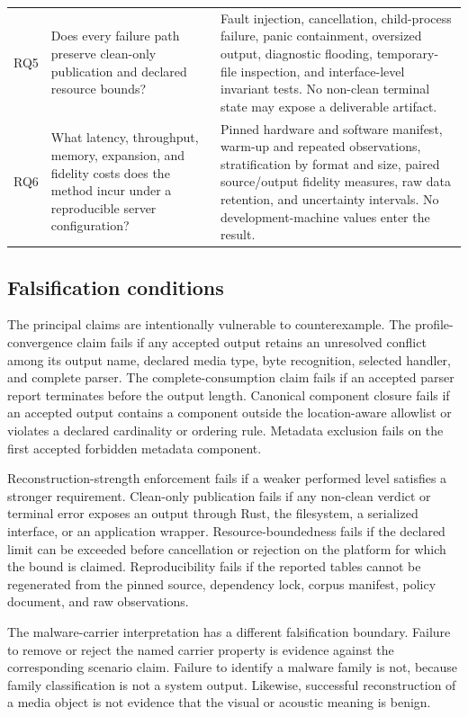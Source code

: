 \begin{longtable}{L{0.08\textwidth}L{0.33\textwidth}L{0.50\textwidth}}
\addlinespace
RQ5 &
Does every failure path preserve clean-only publication and declared resource
bounds? &
Fault injection, cancellation, child-process failure, panic containment,
oversized output, diagnostic flooding, temporary-file inspection, and
interface-level invariant tests. No non-clean terminal state may expose a
deliverable artifact. \\
\addlinespace
RQ6 &
What latency, throughput, memory, expansion, and fidelity costs does the method
incur under a reproducible server configuration? &
Pinned hardware and software manifest, warm-up and repeated observations,
stratification by format and size, paired source/output fidelity measures, raw
data retention, and uncertainty intervals. No development-machine values enter
the result. \\
\end{longtable}
\endgroup

\subsection{Falsification conditions}

The principal claims are intentionally vulnerable to counterexample. The
profile-convergence claim fails if any accepted output retains an unresolved
conflict among its output name, declared media type, byte recognition, selected
handler, and complete parser. The complete-consumption claim fails if an
accepted parser report terminates before the output length. Canonical component
closure fails if an accepted output contains a component outside the
location-aware allowlist or violates a declared cardinality or ordering rule.
Metadata exclusion fails on the first accepted forbidden metadata component.

Reconstruction-strength enforcement fails if a weaker performed level satisfies
a stronger requirement. Clean-only publication fails if any non-clean verdict
or terminal error exposes an output through Rust, the filesystem, a serialized
interface, or an application wrapper. Resource-boundedness fails if the
declared limit can be exceeded before cancellation or rejection on the
platform for which the bound is claimed. Reproducibility fails if the reported
tables cannot be regenerated from the pinned source, dependency lock, corpus
manifest, policy document, and raw observations.

The malware-carrier interpretation has a different falsification boundary.
Failure to remove or reject the named carrier property is evidence against the
corresponding scenario claim. Failure to identify a malware family is not,
because family classification is not a system output. Likewise, successful
reconstruction of a media object is not evidence that the visual or acoustic
meaning is benign.

